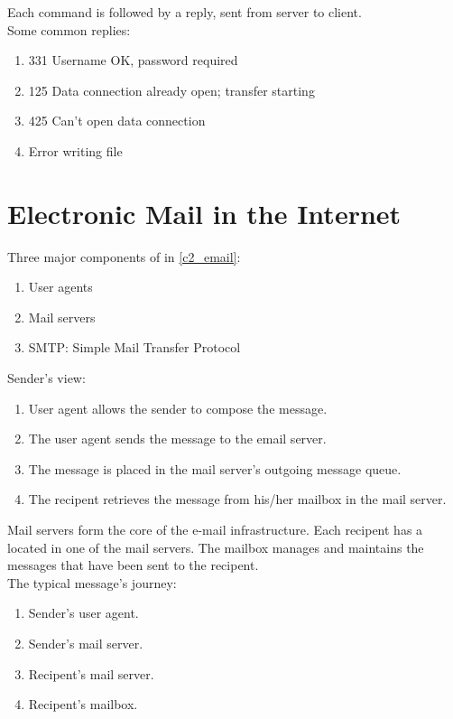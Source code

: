 Each command is followed by a reply, sent from server to client.\\

Some common replies:
\begin{enumerate}
    \item 331 Username OK, password required
    \item 125 Data connection already open; transfer starting
    \item 425 Can't open data connection
    \item Error writing file
\end{enumerate}


\newpage

\section{Electronic Mail in the Internet}

\hf
{}

Three major components of in \autoref{c2_email}:
\begin{enumerate}
    \item User agents
    \item Mail servers
    \item SMTP: Simple Mail Transfer Protocol
\end{enumerate}

Sender's view:
\begin{enumerate}
    \item User agent allows the sender to compose the message.
    \item The user agent sends the message to the email server.
    \item The message is placed in the mail server's outgoing message queue.
    \item The recipent retrieves the message from his/her mailbox in the mail server.
\end{enumerate}

Mail servers form the core of the e-mail infrastructure. Each recipent has
a  located in one of the mail servers. The mailbox manages and maintains
the messages that have been sent to the recipent.\\

The typical message's journey:
\begin{enumerate}
    \item Sender's user agent.
    \item Sender's mail server.
    \item Recipent's mail server.
    \item Recipent's mailbox.
\end{enumerate}

